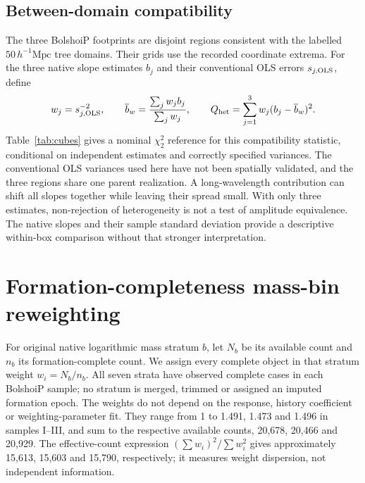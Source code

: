\documentclass[11pt,a4paper]{article}
\begin{document}
\subsection{Between-domain compatibility}\label{supp:cubes}
The three BolshoiP footprints are disjoint regions consistent with the labelled $50\,h^{-1}\mathrm{Mpc}$ tree domains. Their grids use the recorded coordinate extrema. For the three native slope estimates $b_j$ and their conventional OLS errors $s_{j,\rm OLS}$, define
\begin{equation}
 w_j=s_{j,\rm OLS}^{-2},\qquad
 \overline b_w=\frac{\sum_jw_jb_j}{\sum_jw_j},\qquad
 Q_{\rm het}=\sum_{j=1}^{3}w_j(b_j-\overline b_w)^2.
\end{equation}
Table~\ref{tab:cubes} gives a nominal $\chi^2_2$ reference for this compatibility statistic, conditional on independent estimates and correctly specified variances. The conventional OLS variances used here have not been spatially validated, and the three regions share one parent realization. A long-wavelength contribution can shift all slopes together while leaving their spread small. With only three estimates, non-rejection of heterogeneity is not a test of amplitude equivalence. The native slopes and their sample standard deviation provide a descriptive within-box comparison without that stronger interpretation.
\begin{table}[htbp]\centering\small\setlength{\tabcolsep}{3pt}

\caption{BolshoiP within-box slope compatibility. Sample SD uses the three native slopes and denominator two. $Q_{\rm het}$ uses inverse conventional-OLS-variance weights; its nominal probability assumes the $\chi^2_2$ reference. Neither that calculation nor agreement of the point estimates establishes independent cosmological replication or common amplitudes.}\label{tab:cubes}
\end{table}
\FloatBarrier

\section{Formation-completeness mass-bin reweighting}\label{supp:reweight}
For original native logarithmic mass stratum $b$, let $N_b$ be its available count and $n_b$ its formation-complete count. We assign every complete object in that stratum weight $w_i=N_b/n_b$. All seven strata have observed complete cases in each BolshoiP sample; no stratum is merged, trimmed or assigned an imputed formation epoch. The weights do not depend on the response, history coefficient or weighting-parameter fit. They range from 1 to 1.491, 1.473 and 1.496 in samples I--III, and sum to the respective available counts, 20,678, 20,466 and 20,929. The effective-count expression $(\sum w_i)^2/\sum w_i^2$ gives approximately 15,613, 15,603 and 15,790, respectively; it measures weight dispersion, not independent information.
\end{document}
